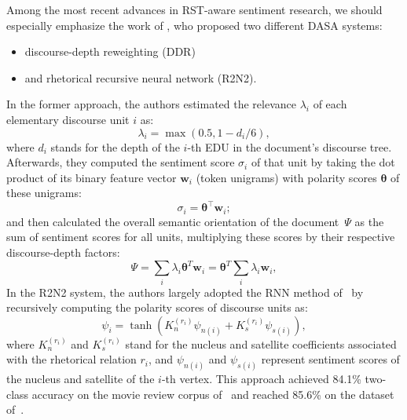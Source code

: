 \documentclass[11pt]{article}
\begin{document}

Among the most recent advances in RST-aware sentiment research, we
should especially emphasize the work of , who
proposed two different DASA systems:
\begin{itemize}
\item discourse-depth reweighting (DDR)
\item and rhetorical recursive neural network (R2N2).
\end{itemize}
In the former approach, the authors estimated the relevance
$\lambda_i$ of each elementary discourse unit $i$ as:
\begin{equation*}
  \lambda_i = \max\left(0.5, 1 - d_i/6\right),
\end{equation*}
where $d_i$ stands for the depth of the $i$-th EDU in the document's
discourse tree.  Afterwards, they computed the sentiment score
$\sigma_i$ of that unit by taking the dot product of its binary
feature vector $\mathbf{w}_i$ (token unigrams) with polarity scores
$\boldsymbol{\theta}$ of these unigrams:
\begin{equation*}
  \sigma_i = \boldsymbol{\theta}^{\top}\mathbf{w}_i;
\end{equation*}
and then calculated the overall semantic orientation of the
document~$\Psi$ as the sum of sentiment scores for all units,
multiplying these scores by their respective discourse-depth factors:
\begin{equation*}
  \Psi = \sum_i\lambda_i\boldsymbol{\theta}^T\mathbf{w}_i = \boldsymbol{\theta}^T\sum_i\lambda_i\mathbf{w}_i,
\end{equation*}
In the R2N2 system, the authors largely adopted the RNN method
of~ by recursively computing the polarity scores of
discourse units as:
\begin{equation*}
  \psi_i = \tanh\left(K_n^{(r_i)} \psi_{n(i)} + K_s^{(r_i)}\psi_{s(i)} \right),
\end{equation*}
where $K_n^{(r_i)}$ and $K_s^{(r_i)}$ stand for the nucleus and
satellite coefficients associated with the rhetorical relation $r_i$,
and $\psi_{n(i)}$ and $\psi_{s(i)}$ represent sentiment scores of the
nucleus and satellite of the $i$-th vertex.  This approach achieved
84.1\% two-class accuracy on the movie review corpus
of~ and reached 85.6\% on the dataset
of~.
\end{document}
